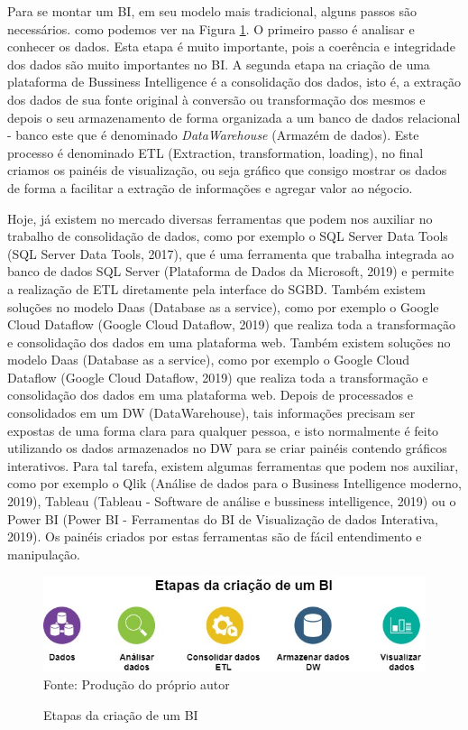 \documentclass[
	12pt,				%
	openright,			%
	oneside,			%
	a4paper,			%
	chapter=TITLE,		%
	section=TITLE,		%
	subsection=TITLE,	%
	subsubsection=TITLE,%
	english,			%
	brazil				%
	]{abntex2}
\theoremstyle{definition}
\begin{document}
    Para se montar um BI, em seu modelo mais tradicional, alguns passos são necessários. como podemos ver na Figura \ref{construcao de bi}. O primeiro passo é analisar e conhecer os dados. Esta etapa é muito importante, pois a coerência e integridade dos dados são muito importantes no BI. A segunda etapa na criação de uma
    plataforma de Bussiness Intelligence é a consolidação dos dados, isto é, a extração dos dados de sua fonte original à conversão ou transformação dos mesmos e depois o seu armazenamento de forma organizada a um banco de dados relacional - banco este que é denominado \textit{DataWarehouse} (Armazém de dados). Este processo é denominado ETL (Extraction, transformation, loading), no final criamos os painéis de visualização, ou seja gráfico que consigo mostrar os dados de forma a facilitar a extração de informações e agregar valor ao négocio. 
    
    Hoje, já existem no mercado diversas ferramentas que podem nos auxiliar no trabalho de consolidação de dados, como por exemplo o SQL Server Data Tools (SQL Server Data Tools, 2017), que é uma ferramenta que trabalha integrada ao banco de dados SQL Server (Plataforma de Dados da Microsoft, 2019) e permite a realização de ETL diretamente pela interface do SGBD. Também existem soluções no modelo Daas (Database as a service), como por exemplo o Google Cloud Dataflow (Google Cloud Dataflow, 2019) que realiza toda a transformação e consolidação dos dados em uma plataforma web. Também existem soluções no modelo Daas (Database as a service), como por exemplo o Google Cloud Dataflow (Google Cloud Dataflow, 2019) que realiza toda a transformação e consolidação dos dados em uma plataforma web. Depois de processados e consolidados em um DW (DataWarehouse), tais informações precisam ser expostas de uma forma clara para qualquer pessoa, e isto normalmente é feito utilizando os dados armazenados no DW para se criar painéis contendo gráficos interativos. Para tal tarefa, existem algumas ferramentas que podem nos auxiliar, como por exemplo o Qlik (Análise de dados para o Business Intelligence moderno, 2019), Tableau (Tableau - Software de análise e bussiness intelligence, 2019) ou o Power BI (Power BI - Ferramentas do BI de Visualização de dados Interativa, 2019). Os painéis criados por estas ferramentas são de fácil entendimento e manipulação.
    
    \begin{figure}[H]
         \centering
         \caption{Etapas da criação de um BI}
         \includegraphics[scale=0.6]{imagens/criacao-bi.jpg}
         \\{\footnotesize Fonte: Produção do próprio autor}
         \label{construcao de bi}
    \end{figure}
    
\end{document}
